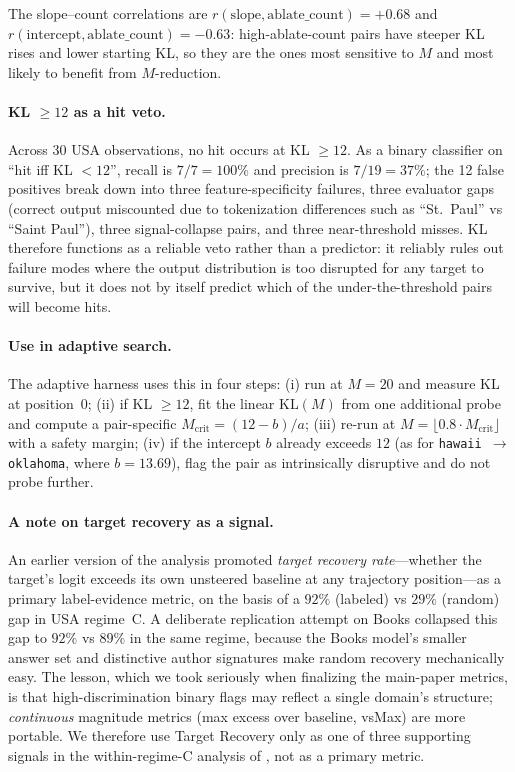 The slope--count correlations are $r(\mathrm{slope}, \mathrm{ablate\_count}) = +0.68$ and $r(\mathrm{intercept}, \mathrm{ablate\_count}) = -0.63$: high-ablate-count pairs have steeper KL rises and lower starting KL, so they are the ones most sensitive to $M$ and most likely to benefit from $M$-reduction.

\paragraph{KL $\geq 12$ as a hit veto.}
Across 30 USA observations, no hit occurs at KL $\geq 12$. As a binary classifier on ``hit iff KL $< 12$'', recall is $7/7 = 100\%$ and precision is $7/19 = 37\%$; the 12 false positives break down into three feature-specificity failures, three evaluator gaps (correct output miscounted due to tokenization differences such as ``St.~Paul'' vs ``Saint Paul''), three signal-collapse pairs, and three near-threshold misses. KL therefore functions as a reliable veto rather than a predictor: it reliably rules out failure modes where the output distribution is too disrupted for any target to survive, but it does not by itself predict which of the under-the-threshold pairs will become hits.

\paragraph{Use in adaptive search.}
The adaptive harness uses this in four steps: (i) run at $M{=}20$ and measure KL at position~0; (ii) if KL $\geq 12$, fit the linear KL$(M)$ from one additional probe and compute a pair-specific $M_{\mathrm{crit}} = (12 - b)/a$; (iii) re-run at $M = \lfloor 0.8 \cdot M_{\mathrm{crit}} \rfloor$ with a safety margin; (iv) if the intercept $b$ already exceeds $12$ (as for \texttt{hawaii $\to$ oklahoma}, where $b{=}13.69$), flag the pair as intrinsically disruptive and do not probe further.

\paragraph{A note on target recovery as a signal.}
An earlier version of the analysis promoted \emph{target recovery rate}---whether the target's logit exceeds its own unsteered baseline at any trajectory position---as a primary label-evidence metric, on the basis of a $92\%$ (labeled) vs $29\%$ (random) gap in USA regime~C. A deliberate replication attempt on Books collapsed this gap to $92\%$ vs $89\%$ in the same regime, because the Books model's smaller answer set and distinctive author signatures make random recovery mechanically easy. The lesson, which we took seriously when finalizing the main-paper metrics, is that high-discrimination binary flags may reflect a single domain's structure; \emph{continuous} magnitude metrics (max excess over baseline, vsMax) are more portable. We therefore use Target Recovery only as one of three supporting signals in the within-regime-C analysis of , not as a primary metric.


